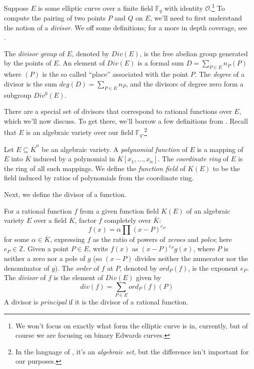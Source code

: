 
Suppose $E$ is some elliptic curve over a finite field $\mathbb{F}_q$ with
    identity $\mathcal{O}$.\footnote{We won't focus on exactly what form the
    elliptic curve is in, currently, but of course we are focusing on binary
    Edwards curves.}
To compute the pairing of two points $P$ and $Q$ on $E$, we'll need to first
    understand the notion of a \textit{divisor}.
We off some definitions; for a more in depth coverage, see
    \cite{grillet2007abstract, silverman2009arithmetic}.

\begin{dfn}
The \textit{divisor group} of $E$, denoted by $Div(E)$, is the free abelian
    group generated by the points of $E$.\cite{silverman2009arithmetic}
An element of $Div(E)$ is a formal sum $D = \sum_{P \in E} n_P(P)$ where $(P)$
    is the so called ``place'' associated with the point $P$.
The \textit{degree} of a divisor is the sum $deg(D) = \sum_{P \in E}n_P$,
    and the divisors of degree zero form a subgroup $Div^0(E)$.
\end{dfn}

There are a special set of divisors that correspond to rational functions over
    $E$, which we'll now discuss.
To get there, we'll borrow a few definitions from \cite{grillet2007abstract}.
Recall that $E$ is an algebraic variety over our field
    $\mathbb{F}_q$.\footnote{In the language of \cite{grillet2007abstract},
    it's an \textit{algebraic set}, but the difference isn't important for our
    purposes.}

\begin{dfn}
Let $E \subseteq \overline{K}^n$ be an algebraic variety.
A \textit{polynomial function} of $E$ is a mapping of $E$ into $\overline{K}$
    induced by a polynomial in $K[x_1, \ldots, x_n]$.
The \textit{coordinate ring} of $E$ is the ring of all such mappings.
We define the \textit{function field} of $K(E)$ to be the field induced by
    ratios of polynomials from the coordinate ring.
\end{dfn}

Next, we define the divisor of a function.

\begin{dfn}
For a rational function $f$ from a given function field $K(E)$ of an algebraic
    variety $E$ over a field $K$, factor $f$ completely over $\overline{K}$:
\[
f(x) = \alpha\prod (x - P)^{e_P}
\]
    for some $\alpha \in \overline{K}$, expressing $f$ as the ratio of powers
        of \textit{zeroes} and \textit{poles}; here $e_P \in \mathbb{Z}$.
Given a point $P \in E$, write $f(x)$ as $(x - P)^{e_P}g(x)$, where $P$ is
    neither a zero nor a pole of $g$ (so $(x - P)$ divides neither the
    numerator nor the denominator of $g$).
The \textit{order} of $f$ at $P$, denoted by $ord_P(f)$, is the exponent $e_P$.
The \textit{divisor} of $f$ is the element of $Div(E)$ given by
\[
div(f) = \sum_{P \in E} ord_P(f)(P)
\]
A divisor is \textit{principal} if it is the divisor of a rational function.
\end{dfn}

